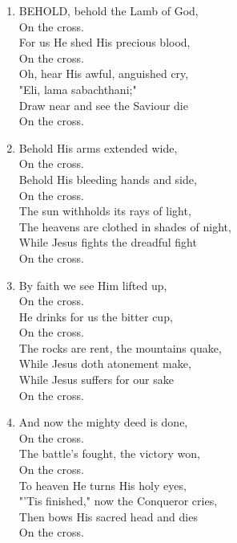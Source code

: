 \begin{enumerate}
    \item BEHOLD, behold the Lamb of God, \\
            On the cross. \\
        For us He shed His precious blood, \\
            On the cross. \\
        Oh, hear His awful, anguished cry, \\
        "Eli, lama sabachthani;" \\
        Draw near and see the Saviour die \\
            On the cross.

    \item Behold His arms extended wide, \\
            On the cross. \\
        Behold His bleeding hands and side, \\
            On the cross. \\
        The sun withholds its rays of light, \\
        The heavens are clothed in shades of night, \\
        While Jesus fights the dreadful fight \\
            On the cross.

    \item By faith we see Him lifted up, \\
            On the cross. \\
        He drinks for us the bitter cup, \\
            On the cross. \\
        The rocks are rent, the mountains quake, \\
        While Jesus doth atonement make, \\
        While Jesus suffers for our sake \\
            On the cross.

    \item And now the mighty deed is done, \\
            On the cross. \\
        The battle's fought, the victory won, \\
            On the cross. \\
        To heaven He turns His holy eyes, \\
        "'Tis finished," now the Conqueror cries, \\
        Then bows His sacred head and dies \\
            On the cross.


\end{enumerate}
